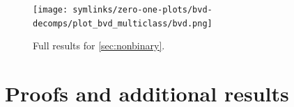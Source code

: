 \documentclass[
	twoside=false, %
]{kaobook}
\begin{document}
\begin{figure}
    \texttt{[image: symlinks/zero-one-plots/bvd-decomps/plot\_bvd\_multiclass/bvd.png]}
    \caption{
      Full results for \cref{sec:nonbinary}. \bvdlegend
    }
    \label{fig:nonbinary-full-results}
\end{figure}





\chapter{Proofs and additional results}
\label{sec:proofs}
\end{document}
